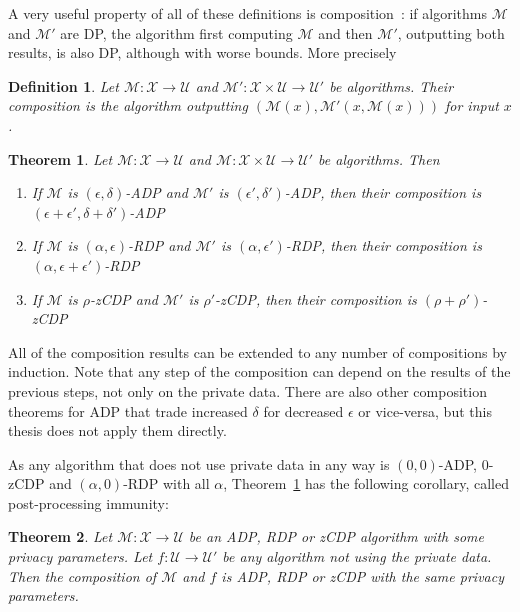 \documentclass[english,twoside,openright]{HYgraduMLDS}
\newtheorem{theorem}{Theorem}
\newtheorem{definition}{Definition}
\newcommand{\calm}{{\mathcal{M}}}
\newcommand{\calx}{{\mathcal{X}}}
\newcommand{\calu}{{\mathcal{U}}}
\begin{document}
A very useful property of all of these definitions is composition~\cite{DwR14}: 
if algorithms \(\calm\) and \(\calm'\) are DP, the algorithm first computing 
\(\calm\) and then \(\calm'\), outputting both results, 
is also DP, although with worse bounds.
More precisely

\begin{definition}
    Let \(\calm\colon \calx \to \calu\) and 
    \(\calm'\colon \calx\times \calu \to \calu'\) be algorithms.
    Their composition is the algorithm outputting 
    \((\calm(x), \calm'(x, \calm(x)))\) for input \(x\).
\end{definition}

\begin{theorem}\label{composition-theorem}
    Let \(\calm\colon \calx \to \calu\) and 
    \(\calm\colon \calx\times \calu \to \calu'\) be algorithms. Then 
    \begin{enumerate}
        \item 
            If \(\calm\) is \((\epsilon, \delta)\)-ADP and 
            \(\calm'\) is \((\epsilon', \delta')\)-ADP, then 
            their composition is 
            \((\epsilon + \epsilon', \delta + \delta')\)-ADP~\cite{DwR14}
        \item 
            If \(\calm\) is \((\alpha, \epsilon)\)-RDP and 
            \(\calm'\) is \((\alpha, \epsilon')\)-RDP, then 
            their composition is \((\alpha, \epsilon + \epsilon')\)-RDP~\cite{Mironov17}
        \item 
            If \(\calm\) is \(\rho\)-zCDP and 
            \(\calm'\) is \(\rho'\)-zCDP, then 
            their composition is \((\rho + \rho')\)-zCDP~\cite{BuS16}
    \end{enumerate}
\end{theorem}

All of the composition results can be extended to any number of compositions 
by induction. Note that any step of the composition can depend on the results 
of the previous steps, not only on the private data. There are also other composition
theorems for ADP that trade increased \(\delta\) for decreased \(\epsilon\)
or vice-versa, but this thesis does not apply them directly.

As any algorithm that does not use private data in any way is 
\((0, 0)\)-ADP, 0-zCDP and \((\alpha, 0)\)-RDP with all \(\alpha\), 
Theorem~\ref{composition-theorem} has the following corollary, called 
post-processing immunity:

\begin{theorem}
    Let \(\calm\colon \calx\to \calu\) be an ADP, RDP or zCDP algorithm with 
    some privacy parameters. Let \(f\colon \calu\to \calu'\) be any algorithm 
    not using the private data. Then the composition of \(\calm\) and \(f\)
    is ADP, RDP or zCDP with the same privacy parameters.
\end{theorem}
\end{document}
